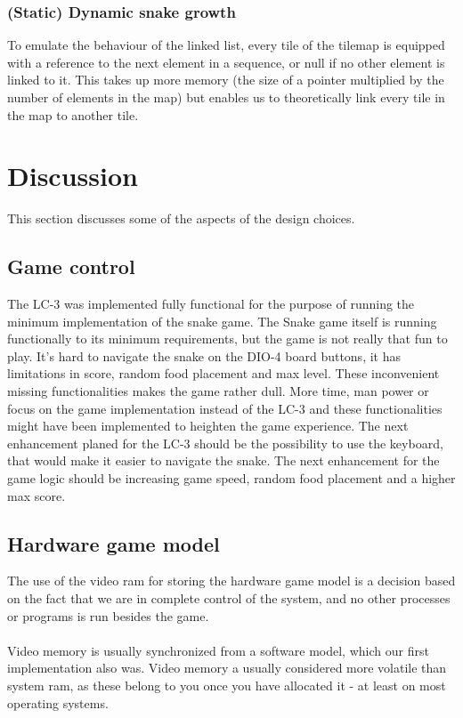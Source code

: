 \documentclass{acm_proc_article-sp}
\begin{document}
\subsubsection{(Static) Dynamic snake growth}
To emulate the behaviour of the linked list, every tile of the tilemap is equipped with a reference to the next element in a sequence, or null if no other element is linked to it. This takes up more memory (the size of a pointer multiplied by the number of elements in the map) but enables us to theoretically link every tile in the map to another tile.

\section{Discussion}
This section discusses some of the aspects of the design choices.
\subsection{Game control}
The LC-3 was implemented fully functional for the purpose of running the minimum implementation of the snake game.
The Snake game itself is running functionally to its minimum requirements, but the game is not really that fun to play. 
It's hard to navigate the snake on the DIO-4 board buttons, it has limitations in score, random food placement and max level.
These inconvenient missing functionalities makes the game rather dull. More time, man power or focus on the game implementation instead of the LC-3 and these functionalities might have been implemented to heighten the game experience.
The next enhancement planed for the LC-3 should be the possibility to use the keyboard, that would make it easier to navigate the snake.
The next enhancement for the game logic should be increasing game speed, random food placement and a higher max score.
\subsection{Hardware game model}
The use of the video ram for storing the hardware game model is a decision based on the fact that we are in complete control of the system, and no other processes or programs is run besides the game.\\\\
Video memory is usually synchronized from a software model, which our first implementation also was. Video memory a usually considered more volatile than system ram, as these belong to you once you have allocated it - at least on most operating systems.
\end{document}
